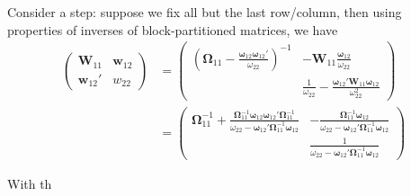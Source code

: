 \documentclass[twoside]{article}
\begin{document}
Consider a  step: suppose we fix all but the last row/column, then using properties of inverses of block-partitioned matrices, we have 
\begin{align*}
    \begin{pmatrix}
        \mathbf{W}_{11} & \mathbf{w}_{12}\\
        \mathbf{w}_{12}' & w_{22}
     \end{pmatrix} &= \begin{pmatrix}
        \left( \boldsymbol{\Omega}_{11}-\frac{\boldsymbol{\omega}_{12}\boldsymbol{\omega}_{12}'}{\omega_{22}} \right)^{-1} & -\mathbf{W}_{11}\frac{\boldsymbol{\omega}_{12}}{\omega_{22}}\\
         & \frac{1}{\omega_{22}}-\frac{\boldsymbol{\omega}_{12}'\mathbf{W}_{11}\boldsymbol{\omega}_{12}}{\omega^2_{22}}
     \end{pmatrix}\\
     &= \begin{pmatrix}
        \boldsymbol{\Omega}^{-1}_{11}+\frac{\boldsymbol{\Omega}^{-1}_{11}\boldsymbol{\omega}_{12}\boldsymbol{\omega}_{12}'\boldsymbol{\Omega}^{-1}_{11}}{\omega_{22}-\boldsymbol{\omega}_{12}'\boldsymbol{\Omega}^{-1}_{11}\boldsymbol{\omega}_{12}} & -\frac{\boldsymbol{\Omega}^{-1}_{11}\boldsymbol{\omega}_{12}}{\omega_{22}-\boldsymbol{\omega}_{12}'\boldsymbol{\Omega}^{-1}_{11}\boldsymbol{\omega}_{12}} \\
        & \frac{1}{\omega_{22}-\boldsymbol{\omega}_{12}'\boldsymbol{\Omega}^{-1}_{11}\boldsymbol{\omega}_{12}}
     \end{pmatrix}
\end{align*}

With th


\newpage


\end{document}
